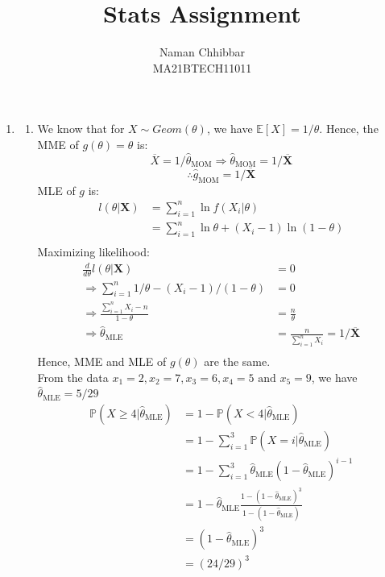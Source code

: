 \documentclass[11pt]{article}
\title{Stats Assignment}
\author{
	Naman Chhibbar \\
	MA21BTECH11011
}
\date{}
\newcommand{\mean}[1]{\boldsymbol{\overline{#1}}}
\newcommand{\mom}[1]{\hat{#1}_{\text{MOM}}}
\newcommand{\mle}[1]{\hat{#1}_{\text{MLE}}}
\begin{document}
	\maketitle

  \begin{enumerate}

    \item[\textbf{Q1}]
    \begin{enumerate}
      \item[(i)] We know that for $X \sim Geom(\theta)$, we have $\mathbb{E}[X] = 1/\theta$.
      Hence, the MME of $g(\theta) = \theta$ is:
      \[\overline{X} = 1 / \mom{\theta} \Rightarrow \mom{\theta} = 1 / \mean{X}\]
      \[\therefore \mom{g} = 1 / \mean{X}\]
      MLE of $g$ is:
      \begin{align*}
        l(\theta | \boldsymbol{X}) &= \sum_{i = 1}^{n} \ln f(X_i | \theta) \\
        &= \sum_{i = 1}^{n} \ln \theta + (X_i - 1) \ln(1 - \theta) \\
      \end{align*}
      Maximizing likelihood:
      \begin{align*}
        \frac{d}{d\theta} l(\theta | \boldsymbol{X}) &= 0 \\
        \Rightarrow \sum_{i = 1}^{n} 1/\theta - (X_i - 1) / (1 - \theta) &= 0 \\
        \Rightarrow \frac{\sum_{i = 1}^{n} X_i - n}{1 - \theta} &= \frac n \theta \\
        \Rightarrow \mle{\theta} &= \frac{n}{\sum_{i = 1}^{n} X_i} = 1 / \mean{X} \\
      \end{align*}
      Hence, MME and MLE of $g(\theta)$ are the same. \\
      From the data $x_1 = 2, x_2 = 7, x_3 = 6, x_4 = 5 \text{ and } x_5 = 9$, we have $\mle{\theta} = 5 / 29$
      \begin{align*}
        \mathbb{P}(X \ge 4 | \mle{\theta}) &= 1 - \mathbb{P}(X < 4 | \mle{\theta}) \\
        &= 1 - \sum_{i = 1}^{3} \mathbb{P}(X = i | \mle{\theta}) \\
        &= 1 - \sum_{i = 1}^{3} \mle{\theta} (1 - \mle{\theta})^{i - 1} \\
        &= 1 - \mle{\theta} \frac{1 - (1 - \mle{\theta})^3}{1 - (1 - \mle{\theta})} \\
        &= (1 - \mle{\theta})^3 \\
        &= (24 / 29)^3 \\
      \end{align*}


\end{enumerate}
\end{enumerate}
\end{document}
